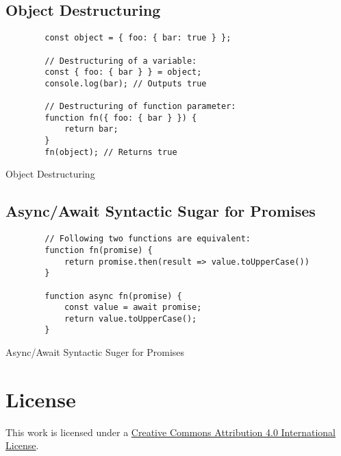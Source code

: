 \documentclass[12pt,a4paper]{article}
\begin{document}
\subsection{Object Destructuring}
\begin{listing}[H]
	\begin{verbatim}
		const object = { foo: { bar: true } };

		// Destructuring of a variable:
		const { foo: { bar } } = object;
		console.log(bar); // Outputs true

		// Destructuring of function parameter:
		function fn({ foo: { bar } }) {
			return bar;
		}
		fn(object); // Returns true
	\end{verbatim}
	\caption{Object Destructuring}
\end{listing}

\subsection{Async/Await Syntactic Sugar for Promises}
\begin{listing}[H]
	\begin{verbatim}
		// Following two functions are equivalent:
		function fn(promise) {
			return promise.then(result => value.toUpperCase())
		}

		function async fn(promise) {
			const value = await promise;
			return value.toUpperCase();
		}
	\end{verbatim}
	\caption{Async/Await Syntactic Suger for Promises}
\end{listing}





\section*{License}
\ccby\thinspace\thinspace This work is licensed under a \href{https://creativecommons.org/licenses/by/4.0/}{Creative Commons Attribution 4.0 International License}.
\end{document}
